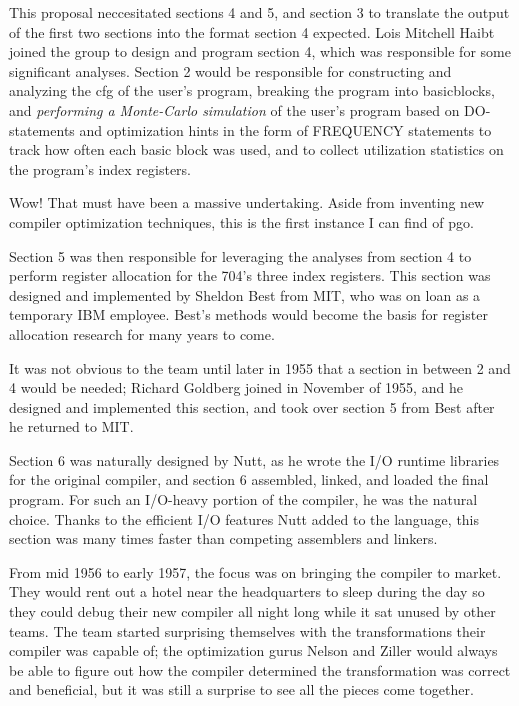 This proposal neccesitated sections 4 and 5, and section 3 to translate the
output of the first two sections into the format section 4 expected.
Lois Mitchell Haibt joined the group to design and program section 4,
which was responsible for some significant analyses.
Section 2 would be responsible for constructing and analyzing the \gls{cfg}
of the user's program, breaking the program into \gls{basicblock}s,
and \textit{performing a Monte-Carlo simulation} of the user's program
based on DO-statements and optimization hints in the form of FREQUENCY statements
to track how often each basic block was used, and to collect utilization
statistics on the program's index registers.

Wow! That must have been a massive undertaking.
Aside from inventing new compiler optimization techniques, this is the first
instance I can find of \gls{pgo}.

Section 5 was then responsible for leveraging the analyses from section 4
to perform register allocation for the 704's three index registers.
This section was designed and implemented by Sheldon Best from MIT,
who was on loan as a temporary IBM employee.
Best's methods would become the basis for register allocation research for many years to come.

It was not obvious to the team until later in 1955 that a section in
between 2 and 4 would be needed; Richard Goldberg joined in November of 1955,
and he designed and implemented this section,
and took over section 5 from Best after he returned to MIT.

Section 6 was naturally designed by Nutt, as he wrote the I/O runtime libraries
for the original compiler, and section 6 assembled, linked, and loaded the final program.
For such an I/O-heavy portion of the compiler, he was the natural choice.
Thanks to the efficient I/O features Nutt added to the language, this section
was many times faster than competing assemblers and linkers.

From mid 1956 to early 1957, the focus was on bringing the compiler to market.
They would rent out a hotel near the headquarters to sleep during the day
so they could debug their new compiler all night long while it sat unused by other
teams.
The team started surprising themselves with the transformations their compiler
was capable of; the optimization gurus Nelson and Ziller would always be able to figure
out how the compiler determined the transformation was correct and beneficial, but
it was still a surprise to see all the pieces come together.

